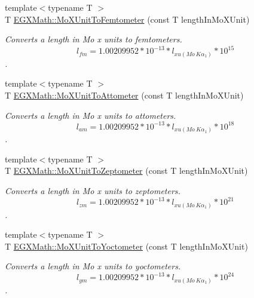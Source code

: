 \begin{DoxyCompactItemize}
{\footnotesize template$<$typename T $>$ }\\T \mbox{\hyperlink{group___e_g_x_math-_conversions-_length_conversions-_non-_s_i-_mo_x_unit-_s_i_ga4ee8e623c653ebdcae1d02ae42714afc}{E\+G\+X\+Math\+::\+Mo\+X\+Unit\+To\+Femtometer}} (const T length\+In\+Mo\+X\+Unit)
\begin{DoxyCompactList}\small\item\em Converts a length in Mo x units to femtometers. \[ l_{fm}=1.00209952*10^{-13} * l_{xu(Mo\ K\alpha_1)} * 10^{15} \]. \end{DoxyCompactList}\item 
{\footnotesize template$<$typename T $>$ }\\T \mbox{\hyperlink{group___e_g_x_math-_conversions-_length_conversions-_non-_s_i-_mo_x_unit-_s_i_gae503164583f30916aea60eda17993712}{E\+G\+X\+Math\+::\+Mo\+X\+Unit\+To\+Attometer}} (const T length\+In\+Mo\+X\+Unit)
\begin{DoxyCompactList}\small\item\em Converts a length in Mo x units to attometers. \[ l_{am}=1.00209952*10^{-13} * l_{xu(Mo\ K\alpha_1)} * 10^{18} \]. \end{DoxyCompactList}\item 
{\footnotesize template$<$typename T $>$ }\\T \mbox{\hyperlink{group___e_g_x_math-_conversions-_length_conversions-_non-_s_i-_mo_x_unit-_s_i_gaab354c6959e3f8243ea2be8b9e500727}{E\+G\+X\+Math\+::\+Mo\+X\+Unit\+To\+Zeptometer}} (const T length\+In\+Mo\+X\+Unit)
\begin{DoxyCompactList}\small\item\em Converts a length in Mo x units to zeptometers. \[ l_{zm}=1.00209952*10^{-13} * l_{xu(Mo\ K\alpha_1)} * 10^{21} \]. \end{DoxyCompactList}\item 
{\footnotesize template$<$typename T $>$ }\\T \mbox{\hyperlink{group___e_g_x_math-_conversions-_length_conversions-_non-_s_i-_mo_x_unit-_s_i_gadfb737fe68fc22991e2c7616212480b6}{E\+G\+X\+Math\+::\+Mo\+X\+Unit\+To\+Yoctometer}} (const T length\+In\+Mo\+X\+Unit)
\begin{DoxyCompactList}\small\item\em Converts a length in Mo x units to yoctometers. \[ l_{ym}=1.00209952*10^{-13} * l_{xu(Mo\ K\alpha_1)} * 10^{24} \]. \end{DoxyCompactList}\end{DoxyCompactItemize}


